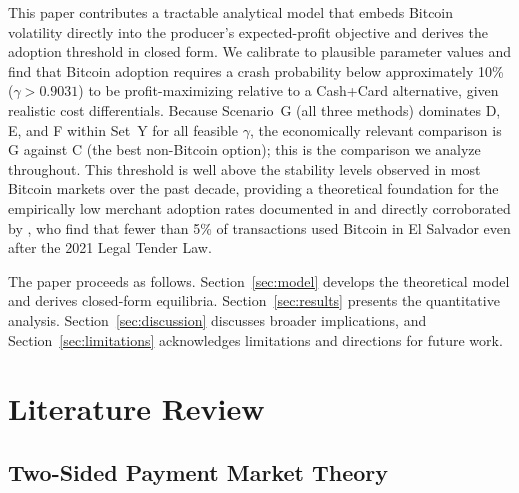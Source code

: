 \documentclass{article}
\begin{document}
This paper contributes a tractable analytical model that embeds Bitcoin
volatility directly into the producer's expected-profit objective and derives
the adoption threshold in closed form.
We calibrate to plausible parameter values and find that Bitcoin adoption
requires a crash probability below approximately 10\% ($\gamma > 0.9031$) to
be profit-maximizing relative to a Cash+Card alternative, given realistic cost
differentials.
Because Scenario~G (all three methods) dominates D, E, and F within Set~Y for
all feasible $\gamma$, the economically relevant comparison is G against C (the
best non-Bitcoin option); this is the comparison we analyze throughout.
This threshold is well above the stability levels observed in most Bitcoin
markets over the past decade, providing a theoretical foundation for the
empirically low merchant adoption rates documented in \citet{catalini2016} and
directly corroborated by \citet{alvarez2023}, who find that fewer than 5\% of
transactions used Bitcoin in El Salvador even after the 2021 Legal Tender Law.

The paper proceeds as follows.
Section~\ref{sec:model} develops the theoretical model and derives
closed-form equilibria.
Section~\ref{sec:results} presents the quantitative analysis.
Section~\ref{sec:discussion} discusses broader implications, and
Section~\ref{sec:limitations} acknowledges limitations and directions for
future work.

\section{Literature Review}
\label{sec:litreview}

\subsection{Two-Sided Payment Market Theory}
\end{document}
